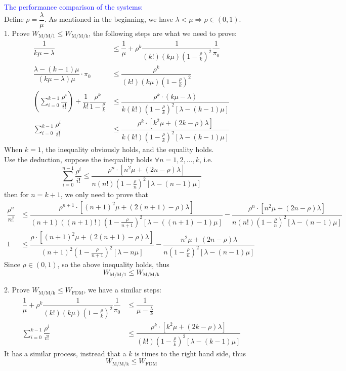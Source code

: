 \begin{homeworkProblem}
\textcolor{blue}{The performance comparison of the systems:} \\
Define $\rho=\dfrac{\lambda}{\mu}$. As mentioned in the beginning, we have $\lambda<\mu\Rightarrow \rho\in(0,1)$. \\
1. Prove $W_{\text{M/M/1}} \leq W_{\text{M/M/k}}$, the following steps are what we need to prove:
\begin{align*}
\dfrac{1}{k\mu-\lambda} &\leq \dfrac{1}{\mu} + \rho^k\dfrac{1}{(k!)(k\mu)\left(1-\frac{\rho}{k}\right)^2}\dfrac{1}{\pi_0} \\
\dfrac{\lambda-(k-1)\mu}{(k\mu-\lambda)\mu}\cdot\pi_0 &\leq \dfrac{\rho^k}{(k!)(k\mu)\left(1-\frac{\rho}{k}\right)^2} \\
\left(\sum_{i=0}^{k-1}\dfrac{\rho^i}{i!}\right)+\dfrac{1}{k!}\dfrac{\rho^k}{1-\frac{\rho}{k}} &\leq \dfrac{\rho^k\cdot (k\mu-\lambda)}{k(k!)\left(1-\frac{\rho}{k}\right)^2\left[\lambda-(k-1)\mu\right]} \\
\sum_{i=0}^{k-1}\dfrac{\rho^i}{i!} &\leq \dfrac{\rho^k\cdot \left[k^2\mu+(2k-\rho)\lambda\right]}{k(k!)\left(1-\frac{\rho}{k}\right)^2\left[\lambda-(k-1)\mu\right]}
\end{align*}
When $k=1$, the inequality obviously holds, and the equality holds. \\
Use the deduction, suppose the inequality holds $\forall n=1,2,\ldots,k$, i.e.
$$\sum_{i=0}^{n-1}\dfrac{\rho^i}{i!} \leq \dfrac{\rho^n\cdot \left[n^2\mu+(2n-\rho)\lambda\right]}{n(n!)\left(1-\frac{\rho}{n}\right)^2\left[\lambda-(n-1)\mu\right]}$$
then for $n=k+1$, we only need to prove that
\begin{align*}
\dfrac{\rho^n}{n!} &\leq \dfrac{\rho^{n+1}\cdot \left[(n+1)^2\mu+(2(n+1)-\rho)\lambda\right]}{(n+1)((n+1)!)\left(1-\frac{\rho}{n+1}\right)^2\left[\lambda-((n+1)-1)\mu\right]} - \dfrac{\rho^n\cdot \left[n^2\mu+(2n-\rho)\lambda\right]}{n(n!)\left(1-\frac{\rho}{n}\right)^2\left[\lambda-(n-1)\mu\right]} \\
1 &\leq \dfrac{\rho\cdot \left[(n+1)^2\mu+(2(n+1)-\rho)\lambda\right]}{(n+1)^2\left(1-\frac{\rho}{n+1}\right)^2\left[\lambda-n\mu\right]} - \dfrac{n^2\mu+(2n-\rho)\lambda}{n\left(1-\frac{\rho}{n}\right)^2\left[\lambda-(n-1)\mu\right]}
\end{align*}
Since $\rho\in(0,1)$, so the above inequality holds, thus
$$W_{\text{M/M/1}} \leq W_{\text{M/M/k}}$$

2. Prove $W_{\text{M/M/k}} \leq W_{\text{FDM}}$, we have a similar steps:
\begin{align*}
\dfrac{1}{\mu} + \rho^k\dfrac{1}{(k!)(k\mu)\left(1-\frac{\rho}{k}\right)^2}\dfrac{1}{\pi_0} &\leq \dfrac{1}{\mu-\frac{\lambda}{k}} \\
\sum_{i=0}^{k-1}\dfrac{\rho^i}{i!} &\leq \dfrac{\rho^k\cdot \left[k^2\mu+(2k-\rho)\lambda\right]}{(k!)\left(1-\frac{\rho}{k}\right)^2\left[\lambda-(k-1)\mu\right]}
\end{align*}
It has a similar process, instread that a $k$ is times to the right hand side, thus
$$W_{\text{M/M/k}} \leq W_{\text{FDM}}$$


\end{homeworkProblem}
